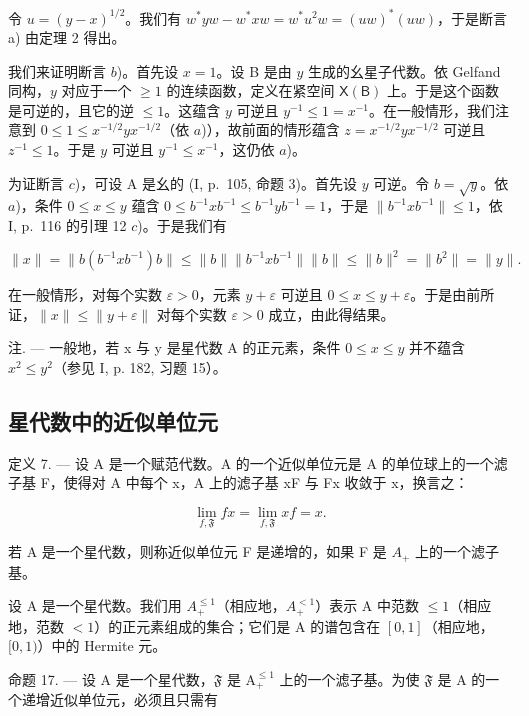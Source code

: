 令 \(u = (y - x)^{1/2}\)。我们有 \(w^{*}yw - w^{*}xw = w^{*}u^{2}w = (uw)^{*}(uw)\)，于是断言 a) 由定理 2 得出。

我们来证明断言 \(b\))。首先设 \(x = 1\)。设 B 是由 \(y\) 生成的幺星子代数。依 Gelfand 同构，\(y\) 对应于一个 \(\geqslant 1\) 的连续函数，定义在紧空间 \(\mathsf{X}(\mathsf{B})\) 上。于是这个函数是可逆的，且它的逆 \(\leqslant 1\)。这蕴含 \(y\) 可逆且 \(y^{-1} \leqslant 1 = x^{-1}\)。在一般情形，我们注意到 \(0 \leqslant 1 \leqslant x^{-1/2}yx^{-1/2}\)（依 \(a\))），故前面的情形蕴含 \(z = x^{-1/2}yx^{-1/2}\) 可逆且 \(z^{-1} \leqslant 1\)。于是 \(y\) 可逆且 \(y^{-1} \leqslant x^{-1}\)，这仍依 \(a\))。

为证断言 \(c\))，可设 A 是幺的 (I, p.~105, 命题 3)。首先设 \(y\) 可逆。令 \(b = \sqrt{y}\)。依 \(a\))，条件 \(0 \leqslant x \leqslant y\) 蕴含 \(0 \leqslant b^{-1}xb^{-1} \leqslant b^{-1}yb^{-1} = 1\)，于是 \(\|b^{-1}xb^{-1}\| \leqslant 1\)，依 I, p.~116 的引理 12 \(c\))。于是我们有

\[
\| x \| = \| b (b ^ {- 1} x b ^ {- 1}) b \| \leqslant \| b \| \| b ^ {- 1} x b ^ {- 1} \| \| b \| \leqslant \| b \| ^ {2} = \| b ^ {2} \| = \| y \|.
\]

在一般情形，对每个实数 \(\varepsilon > 0\)，元素 \(y + \varepsilon\) 可逆且 \(0 \leqslant x \leqslant y + \varepsilon\)。于是由前所证，\(\|x\| \leqslant \|y + \varepsilon\|\) 对每个实数 \(\varepsilon > 0\) 成立，由此得结果。

注. — 一般地，若 x 与 y 是星代数 A 的正元素，条件 \(0 \leqslant x \leqslant y\) 并不蕴含 \(x^{2} \leqslant y^{2}\)（参见 I, p. 182, 习题 15）。

\subsection{星代数中的近似单位元}

定义 7. --- 设 A 是一个赋范代数。A 的一个近似单位元是 A 的单位球上的一个滤子基 F，使得对 A 中每个 x，A 上的滤子基 xF 与 Fx 收敛于 x，换言之：

\[
\lim _ {f, \mathfrak {F}} f x = \lim _ {f, \mathfrak {F}} x f = x.
\]

若 A 是一个星代数，则称近似单位元 F 是递增的，如果 F 是 \(A_{+}\) 上的一个滤子基。

设 A 是一个星代数。我们用 \(A_{+}^{\leqslant1}\)（相应地，\(A_{+}^{<1}\)）表示 A 中范数 \(\leqslant 1\)（相应地，范数 \(< 1\)）的正元素组成的集合；它们是 A 的谱包含在 \([0,1]\)（相应地，\([0,1)\)）中的 Hermite 元。

命题 17. --- 设 A 是一个星代数，\(\mathfrak{F}\) 是 \(\mathrm{A}_{+}^{\leqslant 1}\) 上的一个滤子基。为使 \(\mathfrak{F}\) 是 A 的一个递增近似单位元，必须且只需有

